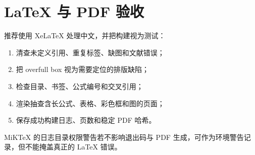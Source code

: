 \section{LaTeX 与 PDF 验收}

推荐使用 XeLaTeX 处理中文，并把构建视为测试：
\begin{enumerate}
  \item 清查未定义引用、重复标签、缺图和文献错误；
  \item 把 overfull box 视为需要定位的排版缺陷；
  \item 检查目录、书签、公式编号和交叉引用；
  \item 渲染抽查含长公式、表格、彩色框和图的页面；
  \item 保存成功构建日志、页数和稳定 PDF 哈希。
\end{enumerate}
MiKTeX 的日志目录权限警告若不影响退出码与 PDF 生成，可作为环境警告记录，但不能掩盖真正的 LaTeX 错误。
